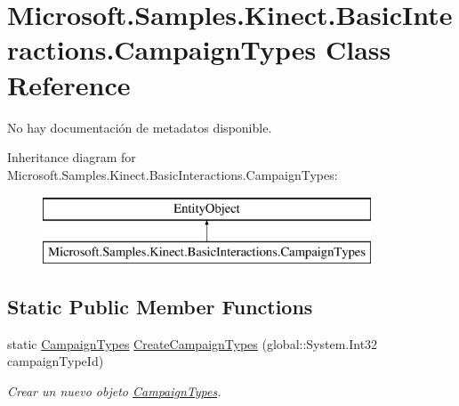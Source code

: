 \hypertarget{class_microsoft_1_1_samples_1_1_kinect_1_1_basic_interactions_1_1_campaign_types}{\section{Microsoft.\-Samples.\-Kinect.\-Basic\-Interactions.\-Campaign\-Types Class Reference}
\label{class_microsoft_1_1_samples_1_1_kinect_1_1_basic_interactions_1_1_campaign_types}
}


No hay documentación de metadatos disponible.  


Inheritance diagram for Microsoft.\-Samples.\-Kinect.\-Basic\-Interactions.\-Campaign\-Types\-:\begin{figure}[H]
\begin{center}
\leavevmode
\includegraphics[height=2.000000cm]{class_microsoft_1_1_samples_1_1_kinect_1_1_basic_interactions_1_1_campaign_types}
\end{center}
\end{figure}
\subsection*{Static Public Member Functions}
\begin{DoxyCompactItemize}
\item 
static \hyperlink{class_microsoft_1_1_samples_1_1_kinect_1_1_basic_interactions_1_1_campaign_types}{Campaign\-Types} \hyperlink{class_microsoft_1_1_samples_1_1_kinect_1_1_basic_interactions_1_1_campaign_types_a13ae9b84fc6c4905c4569f16d2109383}{Create\-Campaign\-Types} (global\-::\-System.\-Int32 campaign\-Type\-Id)
\begin{DoxyCompactList}\small\item\em Crear un nuevo objeto \hyperlink{class_microsoft_1_1_samples_1_1_kinect_1_1_basic_interactions_1_1_campaign_types}{Campaign\-Types}. \end{DoxyCompactList}\end{DoxyCompactItemize}
